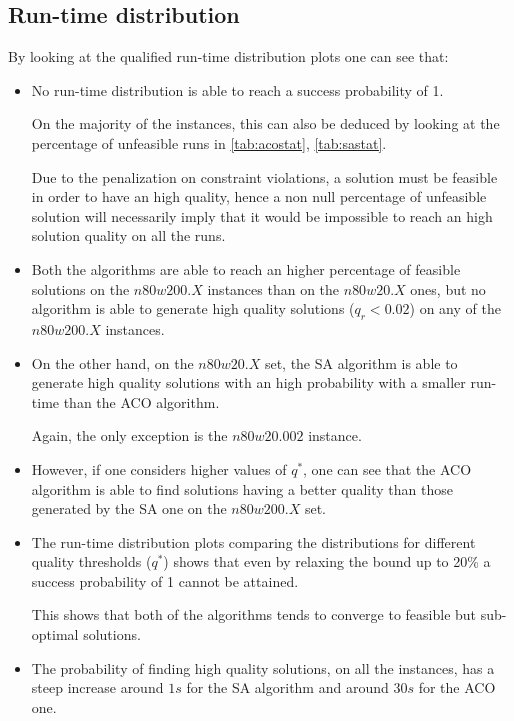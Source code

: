 \subsection{Run-time distribution}
By looking at the qualified run-time distribution plots one can see that:
\begin{itemize}

\item No run-time distribution is able to reach a success probability of 1.

On the majority of the instances, this can also be deduced by looking at the percentage of unfeasible runs in \ref{tab:acostat}, \ref{tab:sastat}. 

Due to the penalization on constraint violations, a solution must be feasible in order to have an high quality, hence a non null percentage of unfeasible solution will necessarily imply that it would be impossible to reach an high solution quality on all the runs.  

\item Both the algorithms are able to reach an higher percentage of feasible solutions on the $n80w200.X$ instances than on the $n80w20.X$ ones, but no algorithm is able to generate high quality solutions ($q_r < 0.02$) on any of the $n80w200.X$ instances.

\item On the other hand, on the $n80w20.X$ set, the SA algorithm is able to generate high quality solutions with an high probability with a smaller run-time than the ACO algorithm.

Again, the only exception is the $n80w20.002$ instance.

\item However, if one considers higher values of $q^{*}$, one can see that the ACO algorithm is able to find solutions having a better quality than those generated by the SA one on the $n80w200.X$ set.

\item The run-time distribution plots comparing the distributions for different quality thresholds ($q^{*}$) shows that even by relaxing the bound up to 20\% a success probability of 1 cannot be attained.

This shows that both of the algorithms tends to converge to feasible but sub-optimal solutions.

\item The probability of finding high quality solutions, on all the instances, has a steep increase around $1s$ for the SA algorithm and around $30s$ for the ACO one.
 
\end{itemize}
